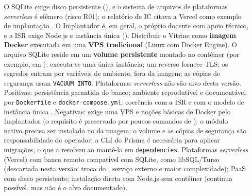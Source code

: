 {O SQLite exige disco persistente (), e o sistema de arquivos de plataformas \emph{serverless} é efêmero (risco R01); o relatório de IC citava a Vercel como exemplo de implantação \cite{reis2026ic}. O Implantador é, em geral, o próprio docente com apoio técnico, e a ISR exige  Node.js e instância única ().}
{Distribuir o Vitrine como \textbf{imagem Docker} executada em uma \textbf{VPS tradicional} (Linux com Docker Engine). O arquivo SQLite reside em um \textbf{volume persistente} montado no contêiner (por exemplo, em ); executa-se uma única instância; um  reverso fornece TLS; os segredos entram por variáveis de ambiente, fora da imagem; as cópias de segurança usam \texttt{VACUUM INTO}. Plataformas \emph{serverless} não são alvo desta versão.}
{Positivas: persistência garantida do banco; ambiente reprodutível e documentável por \texttt{Dockerfile} e \texttt{docker-compose.yml}; coerência com a ISR e com o modelo de instância única \cite{dockerdocs}. Negativas: exige uma VPS e noções básicas de Docker pelo Implantador (o requisito  é preservado por poucos comandos de ); o módulo nativo  precisa ser instalado no  da imagem; o volume e as cópias de segurança são responsabilidade do operador; a CLI do Prisma é necessária para aplicar migrações, o que a  resolveu ao mantê-la em \texttt{dependencies}.}
{Plataformas \emph{serverless} (Vercel) com banco remoto compatível com SQLite, como libSQL/Turso (descartada nesta versão: troca do , serviço externo e maior complexidade); PaaS com disco persistente; instalação direta com Node.js sem contêiner (continua possível, mas não é o alvo documentado).}


